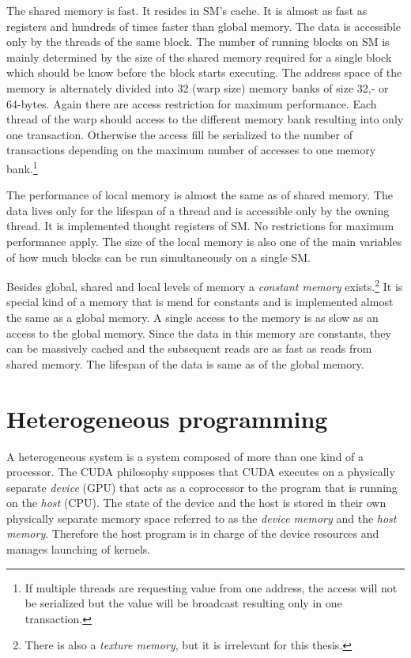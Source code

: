 \documentclass[12pt,oneside]{fithesis2}
\begin{document}
The shared memory is fast. It resides in SM's cache. It is almost as fast as registers and hundreds of times faster than global memory. The data is accessible only by the threads of the same block. The number of running blocks on SM is mainly determined by the size of the shared memory required for a single block which should be know before the block starts executing. The address space of the memory is alternately divided into 32 (warp size) memory banks of size 32,- or 64-bytes. Again there are access restriction for maximum performance. Each thread of the warp should access to the different memory bank resulting into only one transaction. Otherwise the access fill be serialized to the number of transactions depending on the maximum number of accesses to one memory bank.\footnote{If multiple threads are requesting value from one address, the access will not be serialized but the value will be broadcast resulting only in one transaction.}

The performance of local memory is almost the same as of shared memory. The data lives only for the lifespan of a thread and is accessible only by the owning thread. It is implemented thought registers of SM. No restrictions for maximum performance apply. The size of the local memory is also one of the main variables of how much blocks can be run simultaneously on a single SM.

Besides global, shared and local levels of memory a \emph{constant memory} exists.\footnote{There is also a \emph{texture memory}, but it is irrelevant for this thesis.} It is special kind of a memory that is mend for constants and is implemented almost the same as a global memory. A single access to the memory is as slow as an access to the global memory. Since the data in this memory are constants, they can be massively cached and the subsequent reads are as fast as reads from shared memory. The lifespan of the data is same as of the global memory.

\newpage

\section{Heterogeneous programming}
\label{heterogeneous_programming}

A heterogeneous system is a system composed of more than one kind of a processor. The CUDA philosophy supposes that CUDA executes on a physically separate \emph{device} (GPU) that acts as a coprocessor to the program that is running on the \emph{host} (CPU). The state of the device and the host is stored in their own physically separate memory space referred to as the \emph{device memory} and the \emph{host memory}. Therefore the host program is in charge of the device resources and manages launching of kernels.
\end{document}
